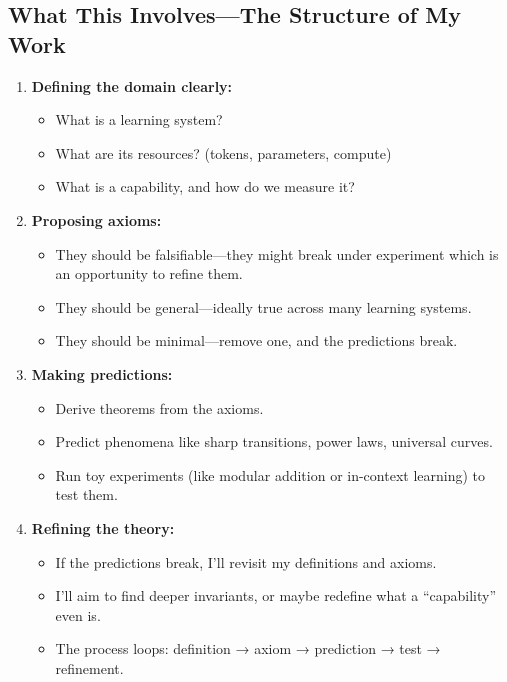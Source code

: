 \documentclass[12pt]{article}
\begin{document}
\subsection{What This Involves—The Structure of My Work}
\begin{enumerate}
    \item \textbf{Defining the domain clearly:} \begin{itemize}
        \item What is a learning system?
        \item What are its resources? (tokens, parameters, compute)
        \item What is a capability, and how do we measure it?
    \end{itemize}

    \item \textbf{Proposing axioms:} \begin{itemize}
        \item They should be falsifiable—they might break under experiment which is an opportunity to refine them.
        \item They should be general—ideally true across many learning systems.
        \item They should be minimal—remove one, and the predictions break.
    \end{itemize}

    \item \textbf{Making predictions:} \begin{itemize}
        \item Derive theorems from the axioms.
        \item Predict phenomena like sharp transitions, power laws, universal curves.
        \item Run toy experiments (like modular addition or in-context learning) to test them.
    \end{itemize}

    \item \textbf{Refining the theory:} \begin{itemize}
        \item If the predictions break, I’ll revisit my definitions and axioms.
        \item I’ll aim to find deeper invariants, or maybe redefine what a “capability” even is.
        \item The process loops: definition → axiom → prediction → test → refinement.
    \end{itemize}
\end{enumerate}
\end{document}
